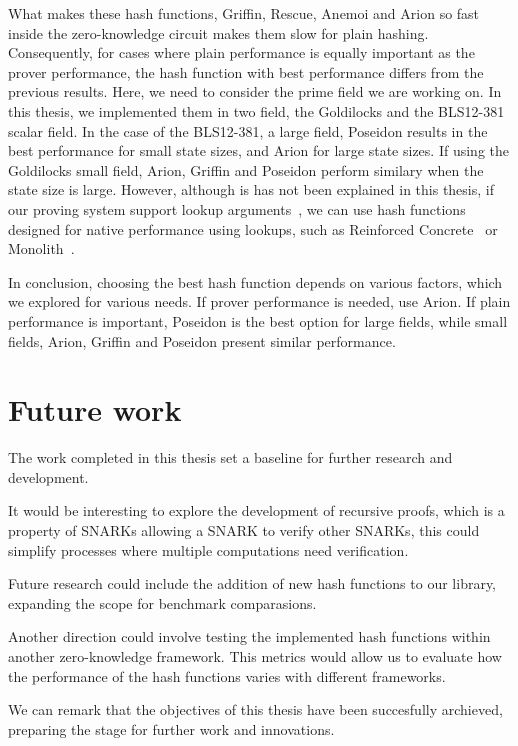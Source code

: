 What makes these hash functions, Griffin, Rescue, Anemoi and Arion so fast inside the zero-knowledge circuit makes them slow for plain hashing. Consequently, for cases where plain performance is equally important as the prover performance, the hash function with best performance differs from the previous results. Here, we need to consider the prime field we are working on. In this thesis, we implemented them in two field, the Goldilocks and the BLS12-381 scalar field. In the case of the BLS12-381, a large field, Poseidon results in the best performance for small state sizes, and Arion for large state sizes. If using the Goldilocks small field, Arion, Griffin and Poseidon perform similary when the state size is large. However, although is has not been explained in this thesis, if our proving system support lookup arguments~\cite{10.1007/978-3-030-03326-2_20, cryptoeprint:2022/1763, cryptoeprint:2022/957, 10.1145/3548606.3560646, cryptoeprint:2022/1565}, we can use hash functions designed for native performance using lookups, such as Reinforced Concrete~\cite{cryptoeprint:2021/1038} or Monolith~\cite{cryptoeprint:2023/1025}.

In conclusion, choosing the best hash function depends on various factors, which we explored for various needs. If prover performance is needed, use Arion. If plain performance is important, Poseidon is the best option for large fields, while small fields, Arion, Griffin and Poseidon present similar performance.

\section{Future work}
The work completed in this thesis set a baseline for further research and development.

It would be interesting to explore the development of recursive proofs, which is a property of SNARKs allowing a SNARK to verify other SNARKs, this could simplify processes where multiple computations need verification.

Future research could include the addition of new hash functions to our library, expanding the scope for benchmark comparasions.

Another direction could involve testing the implemented hash functions within another zero-knowledge framework. This metrics would allow us to evaluate how the performance of the hash functions varies with different frameworks.

We can remark that the objectives of this thesis have been succesfully archieved, preparing the stage for further work and innovations.
